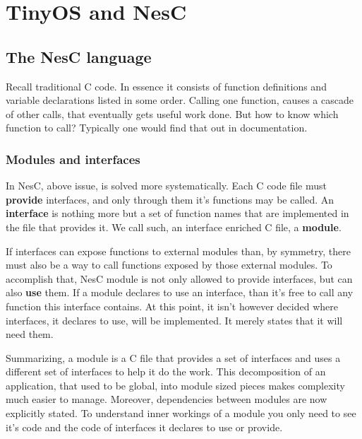 \chapter{TinyOS and NesC}

\section{The NesC language}

%

Recall traditional C code. In essence it consists of function
definitions and variable declarations listed in some order.  Calling
one function, causes a cascade of other calls, that eventually gets
useful work done. But how to know which function to call? Typically one
would find that out in documentation.

\subsection{Modules and interfaces}

In NesC, above issue, is solved more systematically. Each C code file
must {\bf provide} interfaces, and only through them it's functions may be
called. An {\bf interface} is nothing more but a set of function names
that are implemented in the file that provides it. We call such,
an interface enriched C file, a {\bf module}.

If interfaces can expose functions to external modules than, by
symmetry, there must also be a way to call functions exposed by those
external modules. To accomplish that, NesC module is not only allowed
to provide interfaces, but can also {\bf use} them. If a module declares to
use an interface, than it's free to call any function this interface
contains. At this point, it isn't however decided where interfaces, it
declares to use, will be implemented. It merely states that it will
need them.

Summarizing, a module is a C file that provides a set of interfaces
and uses a different set of interfaces to help it do the work. This
decomposition of an application, that used to be global, into module
sized pieces makes complexity much easier to manage. Moreover,
dependencies between modules are now explicitly stated. To understand
inner workings of a module you only need to see it's code and the code
of interfaces it declares to use or provide.

